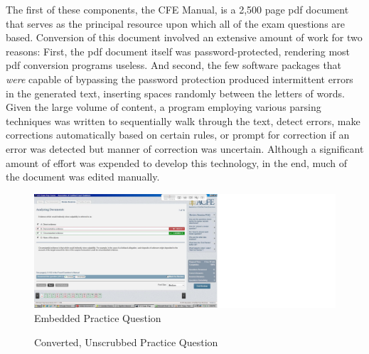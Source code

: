The first of these components, the CFE Manual, is a 2,500 page pdf document that serves as the principal resource upon which all of the exam questions are based.  Conversion of this document involved an extensive amount of work for two reasons:  First, the pdf document itself was password-protected, rendering most pdf conversion programs useless.  And second, the few software packages that \textit{were} capable of bypassing the password protection produced intermittent errors in the generated text, inserting spaces randomly between the letters of words.  Given the large volume of content, a program employing various parsing techniques was written to sequentially walk through the text, detect errors, make corrections automatically based on certain rules, or prompt for correction if an error was detected but manner of correction was uncertain.  Although a significant amount of effort was expended to develop this technology, in the end, much of the document was edited manually.  

\begin{figure}
\centering
\vspace{2.0in}
\includegraphics[width=200mm]{study_package_screen_shot.jpg}
\caption{Embedded Practice Question}
\label{fig:study_package_screen_shot}
\end{figure}

\begin{figure}
\centering
\vspace{2.0in}
\caption{Converted, Unscrubbed Practice Question}
\label{fig:study_package_unformatted_text}
\end{figure}

